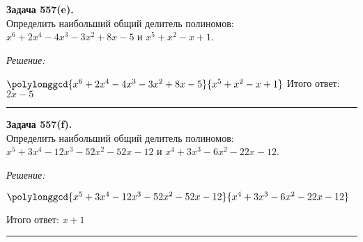 \documentclass[a4paper, 12pt]{article}
\newenvironment{problem}[2][Задача]
    { \begin{mdframed}[backgroundcolor=gray!10] \textbf{#1 #2.} \\}
    {  \end{mdframed}}
\newenvironment{solution}
    {\textit{Решение: }}
    {\noindent\rule{7in}{1.5pt}}
\begin{document}
\begin{problem}{557(e)}
Определить наибольший общий делитель полиномов: $x^6+2x^4-4x^3-3x^2+8x-5$ и $x^5+x^2-x+1$.
\end{problem}
\begin{solution}

$
\polylonggcd{x^6+2x^4-4x^3-3x^2+8x-5}{x^5+x^2-x+1} \\
$
Итого ответ: $2x-5$


\end{solution}

\begin{problem}{557(f)}
Определить наибольший общий делитель полиномов: $x^5+3x^4-12x^3-52x^2-52x-12$ и $x^4+3x^3-6x^2-22x-12$.
\end{problem}
\begin{solution}

$
\polylonggcd{x^5+3x^4-12x^3-52x^2-52x-12}{x^4+3x^3-6x^2-22x-12} \\
$

Итого ответ: $x + 1$

\end{solution}
\end{document}
